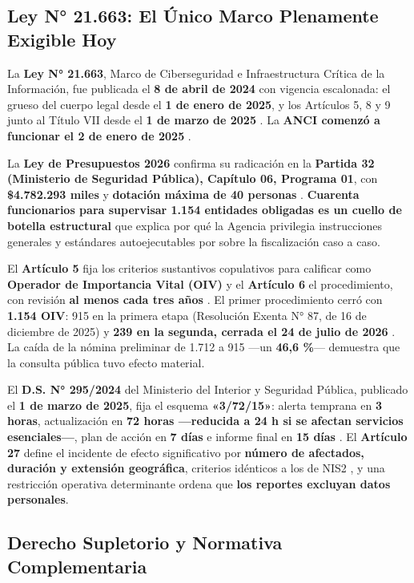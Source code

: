 \subsection{Ley N° 21.663: El Único Marco Plenamente Exigible Hoy}\label{ley-n-21.663-el-uxfanico-marco-plenamente-exigible-hoy}

La \textbf{Ley N° 21.663}, Marco de Ciberseguridad e Infraestructura Crítica de la Información, fue publicada el \textbf{8 de abril de 2024} con vigencia escalonada: el grueso del cuerpo legal desde el \textbf{1 de enero de 2025}, y los Artículos 5, 8 y 9 junto al Título VII desde el \textbf{1 de marzo de 2025} . La \textbf{ANCI comenzó a funcionar el 2 de enero de 2025} .

La \textbf{Ley de Presupuestos 2026} confirma su radicación en la \textbf{Partida 32 (Ministerio de Seguridad Pública), Capítulo 06, Programa 01}, con \textbf{\$4.782.293 miles} y \textbf{dotación máxima de 40 personas} . \textbf{Cuarenta funcionarios para supervisar 1.154 entidades obligadas es un cuello de botella estructural} que explica por qué la Agencia privilegia instrucciones generales y estándares autoejecutables por sobre la fiscalización caso a caso.

El \textbf{Artículo 5} fija los criterios sustantivos copulativos para calificar como \textbf{Operador de Importancia Vital (OIV)} y el \textbf{Artículo 6} el procedimiento, con revisión \textbf{al menos cada tres años} . El primer procedimiento cerró con \textbf{1.154 OIV}: 915 en la primera etapa (Resolución Exenta N° 87, de 16 de diciembre de 2025) y \textbf{239 en la segunda, cerrada el 24 de julio de 2026} . La caída de la nómina preliminar de 1.712 a 915 ---un \textbf{46,6 \%}--- demuestra que la consulta pública tuvo efecto material.

El \textbf{D.S. N° 295/2024} del Ministerio del Interior y Seguridad Pública, publicado el \textbf{1 de marzo de 2025}, fija el esquema \textbf{«3/72/15»}: alerta temprana en \textbf{3 horas}, actualización en \textbf{72 horas ---reducida a 24 h si se afectan servicios esenciales---}, plan de acción en \textbf{7 días} e informe final en \textbf{15 días} . El \textbf{Artículo 27} define el incidente de efecto significativo por \textbf{número de afectados, duración y extensión geográfica}, criterios idénticos a los de NIS2 , y una restricción operativa determinante ordena que \textbf{los reportes excluyan datos personales}.

\subsection{Derecho Supletorio y Normativa Complementaria}\label{derecho-supletorio-y-normativa-complementaria}

